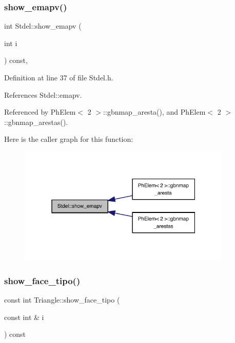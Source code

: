 \subsubsection{\texorpdfstring{show\+\_\+emapv()}{show\_emapv()}}
{\footnotesize\ttfamily int Stdel\+::show\+\_\+emapv (\begin{DoxyParamCaption}\item[{int}]{i }\end{DoxyParamCaption}) const\hspace{0.3cm}{\ttfamily [inline]}, {\ttfamily [inherited]}}



Definition at line 37 of file Stdel.\+h.



References Stdel\+::emapv.



Referenced by Ph\+Elem$<$ 2 $>$\+::gbnmap\+\_\+aresta(), and Ph\+Elem$<$ 2 $>$\+::gbnmap\+\_\+arestas().

Here is the caller graph for this function\+:
\nopagebreak
\begin{figure}[H]
\begin{center}
\leavevmode
\includegraphics[width=289pt]{classStdel_ad474ffc52b051ae8317b3fdb583c4c98_icgraph}
\end{center}
\end{figure}
\mbox{\label{classTriangle_a7f711afd182aa8bae52c8acfa4ce3690}} 
\subsubsection{\texorpdfstring{show\+\_\+face\+\_\+tipo()}{show\_face\_tipo()}}
{\footnotesize\ttfamily const int Triangle\+::show\+\_\+face\+\_\+tipo (\begin{DoxyParamCaption}\item[{const int \&}]{i }\end{DoxyParamCaption}) const\hspace{0.3cm}{\ttfamily [virtual]}}



